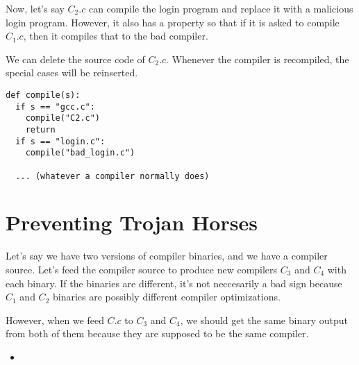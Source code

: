 \documentclass[psamsfonts]{amsart}
\begin{document}
Now, let's say $C_2.c$ can compile the login program and replace it with a malicious login program. However, it also has a property so that if it is asked to compile $C_1.c$, then it compiles that to the bad compiler.

We can delete the source code of $C_2.c$. Whenever the compiler is recompiled, the special cases will be reinserted.

\begin{verbatim}
def compile(s):
  if s == "gcc.c":
    compile("C2.c")
    return
  if s == "login.c":
    compile("bad_login.c")

  ... (whatever a compiler normally does)
\end{verbatim}

\section{Preventing Trojan Horses}

Let's say we have two versions of compiler binaries, and we have a compiler source. Let's feed the compiler source to produce new compilers $C_3$ and $C_4$ with each binary. If the binaries are different, it's not neccesarily a bad sign because $C_1$ and $C_2$ binaries are possibly different compiler optimizations.

However, when we feed $C.c$ to $C_3$ and $C_4$, we should get the same binary output from both of them because they are supposed to be the same compiler.

\begin{itemize}
  \item
\end{itemize}
\end{document}
